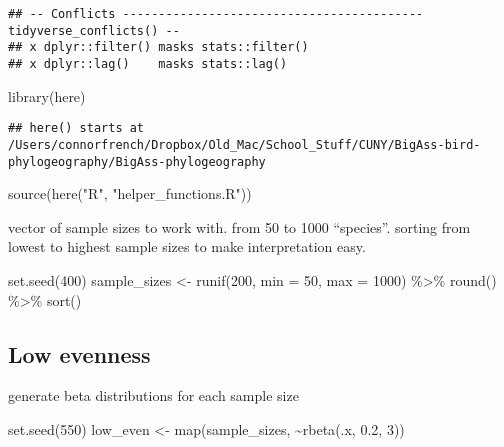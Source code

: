 \documentclass[
]{article}
\newenvironment{Shaded}{\begin{snugshade}}{\end{snugshade}}
\newcommand{\AttributeTok}[1]{\textcolor[rgb]{0.77,0.63,0.00}{#1}}
\newcommand{\DecValTok}[1]{\textcolor[rgb]{0.00,0.00,0.81}{#1}}
\newcommand{\FloatTok}[1]{\textcolor[rgb]{0.00,0.00,0.81}{#1}}
\newcommand{\FunctionTok}[1]{\textcolor[rgb]{0.00,0.00,0.00}{#1}}
\newcommand{\NormalTok}[1]{#1}
\newcommand{\OtherTok}[1]{\textcolor[rgb]{0.56,0.35,0.01}{#1}}
\newcommand{\SpecialCharTok}[1]{\textcolor[rgb]{0.00,0.00,0.00}{#1}}
\newcommand{\StringTok}[1]{\textcolor[rgb]{0.31,0.60,0.02}{#1}}
\begin{document}
\begin{verbatim}
## -- Conflicts ------------------------------------------ tidyverse_conflicts() --
## x dplyr::filter() masks stats::filter()
## x dplyr::lag()    masks stats::lag()
\end{verbatim}

\begin{Shaded}
\begin{Highlighting}[]
\FunctionTok{library}\NormalTok{(here)}
\end{Highlighting}
\end{Shaded}

\begin{verbatim}
## here() starts at /Users/connorfrench/Dropbox/Old_Mac/School_Stuff/CUNY/BigAss-bird-phylogeography/BigAss-phylogeography
\end{verbatim}

\begin{Shaded}
\begin{Highlighting}[]
\FunctionTok{source}\NormalTok{(}\FunctionTok{here}\NormalTok{(}\StringTok{"R"}\NormalTok{, }\StringTok{"helper\_functions.R"}\NormalTok{))}
\end{Highlighting}
\end{Shaded}

vector of sample sizes to work with. from 50 to 1000 ``species''.
sorting from lowest to highest sample sizes to make interpretation easy.

\begin{Shaded}
\begin{Highlighting}[]
\FunctionTok{set.seed}\NormalTok{(}\DecValTok{400}\NormalTok{)}
\NormalTok{sample\_sizes }\OtherTok{\textless{}{-}} \FunctionTok{runif}\NormalTok{(}\DecValTok{200}\NormalTok{, }\AttributeTok{min =} \DecValTok{50}\NormalTok{, }\AttributeTok{max =} \DecValTok{1000}\NormalTok{) }\SpecialCharTok{\%\textgreater{}\%} 
  \FunctionTok{round}\NormalTok{() }\SpecialCharTok{\%\textgreater{}\%} 
  \FunctionTok{sort}\NormalTok{()}
\end{Highlighting}
\end{Shaded}

\hypertarget{low-evenness}{%
\subsection{Low evenness}\label{low-evenness}}

generate beta distributions for each sample size

\begin{Shaded}
\begin{Highlighting}[]
\FunctionTok{set.seed}\NormalTok{(}\DecValTok{550}\NormalTok{)}
\NormalTok{low\_even }\OtherTok{\textless{}{-}} \FunctionTok{map}\NormalTok{(sample\_sizes, }\SpecialCharTok{\textasciitilde{}}\FunctionTok{rbeta}\NormalTok{(.x, }\FloatTok{0.2}\NormalTok{, }\DecValTok{3}\NormalTok{)) }
\end{Highlighting}
\end{Shaded}
\end{document}
